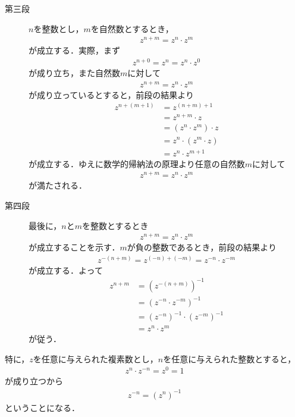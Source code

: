 \begin{sketch}
\begin{description}
			\item[第三段]
				$n$を整数とし，$m$を自然数とするとき，
				\begin{align}
					z^{n+m} = z^{n} \cdot z^{m}
				\end{align}
				が成立する．実際，まず
				\begin{align}
					z^{n+0} = z^{n} = z^{n} \cdot z^{0}
				\end{align}
				が成り立ち，また自然数$m$に対して
				\begin{align}
					z^{n+m} = z^{n} \cdot z^{m}
				\end{align}
				が成り立っているとすると，前段の結果より
				\begin{align}
					z^{n+(m+1)} &= z^{(n+m)+1} \\
					&= z^{n+m} \cdot z \\
					&= (z^{n} \cdot z^{m}) \cdot z \\
					&= z^{n} \cdot (z^{m} \cdot z) \\
					&= z^{n} \cdot z^{m+1}
				\end{align}
				が成立する．ゆえに数学的帰納法の原理より任意の自然数$m$に対して
				\begin{align}
					z^{n+m} = z^{n} \cdot z^{m}
				\end{align}
				が満たされる．
				
			\item[第四段]
				最後に，$n$と$m$を整数とするとき
				\begin{align}
					z^{n+m} = z^{n} \cdot z^{m}
				\end{align}
				が成立することを示す．$m$が負の整数であるとき，前段の結果より
				\begin{align}
					z^{-(n+m)} = z^{(-n) + (-m)} = z^{-n} \cdot z^{-m}
				\end{align}
				が成立する．よって
				\begin{align}
					z^{n+m} &= (z^{-(n+m)})^{-1} \\
					&= (z^{-n} \cdot z^{-m})^{-1} \\
					&= (z^{-n})^{-1} \cdot (z^{-m})^{-1} \\
					&= z^{n} \cdot z^{m}
				\end{align}
				が従う．
				\QED
		\end{description}
	\end{sketch}
	
	特に，$z$を任意に与えられた複素数とし，$n$を任意に与えられた整数とすると，
	\begin{align}
		z^{n} \cdot z^{-n} = z^{0} = 1
	\end{align}
	が成り立つから
	\begin{align}
		z^{-n} = (z^{n})^{-1}
	\end{align}
	ということになる．
	
